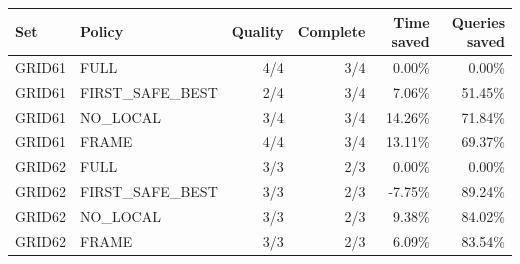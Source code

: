 \begin{tabular}{llrrrr}
\toprule
Set & Policy & Quality & Complete & Time saved & Queries saved \\
\midrule
GRID61 & FULL & 4/4 & 3/4 & 0.00\% & 0.00\% \\
GRID61 & FIRST\_SAFE\_BEST & 2/4 & 3/4 & 7.06\% & 51.45\% \\
GRID61 & NO\_LOCAL & 3/4 & 3/4 & 14.26\% & 71.84\% \\
GRID61 & FRAME & 4/4 & 3/4 & 13.11\% & 69.37\% \\
GRID62 & FULL & 3/3 & 2/3 & 0.00\% & 0.00\% \\
GRID62 & FIRST\_SAFE\_BEST & 3/3 & 2/3 & -7.75\% & 89.24\% \\
GRID62 & NO\_LOCAL & 3/3 & 2/3 & 9.38\% & 84.02\% \\
GRID62 & FRAME & 3/3 & 2/3 & 6.09\% & 83.54\% \\
\bottomrule
\end{tabular}
